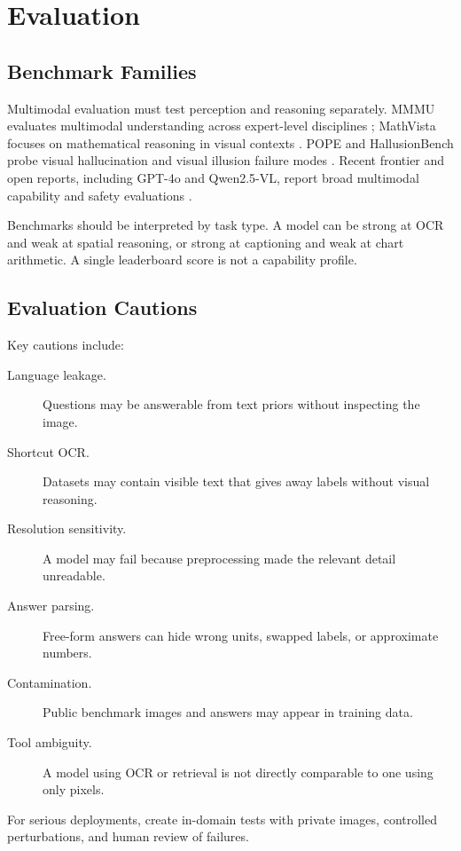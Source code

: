 \section{Evaluation}
\subsection{Benchmark Families}
Multimodal evaluation must test perception and reasoning separately. MMMU evaluates multimodal understanding across expert-level disciplines \cite{yue2023mmmu}; MathVista focuses on mathematical reasoning in visual contexts \cite{lu2023mathvista}. POPE and HallusionBench probe visual hallucination and visual illusion failure modes \cite{li2023pope,guan2023hallusionbench}. Recent frontier and open reports, including GPT-4o and Qwen2.5-VL, report broad multimodal capability and safety evaluations \cite{openai2024gpt4o,qwen2025vl,han2025multimodal}.

Benchmarks should be interpreted by task type. A model can be strong at OCR and weak at spatial reasoning, or strong at captioning and weak at chart arithmetic. A single leaderboard score is not a capability profile.

\subsection{Evaluation Cautions}
Key cautions include:
\begin{description}
    \item[Language leakage.] Questions may be answerable from text priors without inspecting the image.
    \item[Shortcut OCR.] Datasets may contain visible text that gives away labels without visual reasoning.
    \item[Resolution sensitivity.] A model may fail because preprocessing made the relevant detail unreadable.
    \item[Answer parsing.] Free-form answers can hide wrong units, swapped labels, or approximate numbers.
    \item[Contamination.] Public benchmark images and answers may appear in training data.
    \item[Tool ambiguity.] A model using OCR or retrieval is not directly comparable to one using only pixels.
\end{description}
For serious deployments, create in-domain tests with private images, controlled perturbations, and human review of failures.

